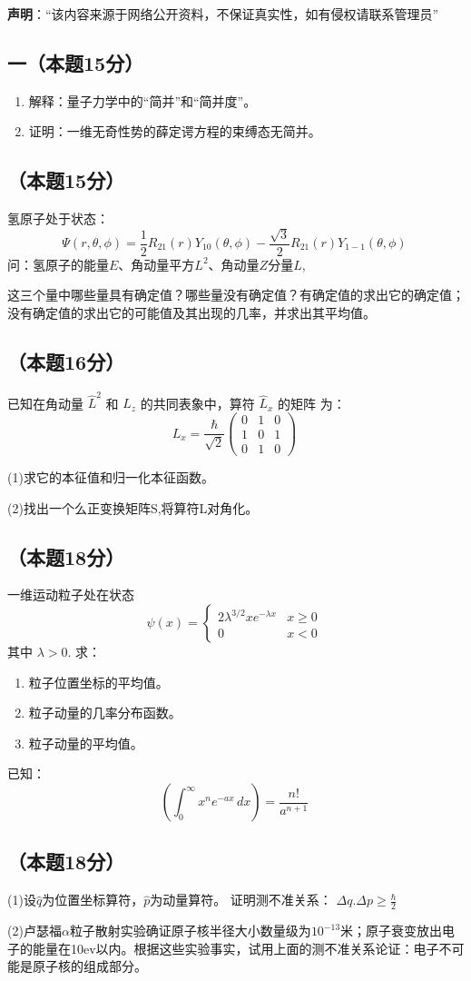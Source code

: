 
\textbf{声明}：“该内容来源于网络公开资料，不保证真实性，如有侵权请联系管理员”

\subsection{一（本题15分）}
\begin{enumerate}
\item 解释：量子力学中的“简并”和“简并度”。
\item 证明：一维无奇性势的薛定谔方程的束缚态无简并。
\end{enumerate}

\subsection{（本题15分）}
氢原子处于状态：
$$\Psi(r, \theta, \phi) = \frac{1}{2} R_{21}(r) Y_{10}(\theta, \phi) - \frac{\sqrt{3}}{2} R_{21}(r) Y_{1-1}(\theta, \phi)~$$
问：氢原子的能量$E$、角动量平方$L^2$、角动量$Z$分量$L$,

这三个量中哪些量具有确定值？哪些量没有确定值？有确定值的求出它的确定值；没有确定值的求出它的可能值及其出现的几率，并求出其平均值。

\subsection{（本题16分）}
已知在角动量 $\hat{L}^2$ 和 $\hat{L}_z$ 的共同表象中，算符 $\hat{L}_x$ 的矩阵
为：$$L_x = \frac{\hbar}{\sqrt{2}} \begin{pmatrix}
0 & 1 & 0 \\
1 & 0 & 1 \\
0 & 1 & 0
\end{pmatrix}~$$

(1)求它的本征值和归一化本征函数。

(2)找出一个么正变换矩阵S,将算符L对角化。

\subsection{（本题18分）}
一维运动粒子处在状态
$$\psi(x) = 
\begin{cases} 
2\lambda^{3/2} x e^{-\lambda x} &  x \geq 0 \\
0 &  x < 0
\end{cases}~$$
其中 $\lambda > 0$. 求：
\begin{enumerate}
    \item 粒子位置坐标的平均值。
    \item 粒子动量的几率分布函数。
    \item 粒子动量的平均值。
\end{enumerate}
已知：
$$\left( \int_{0}^{\infty} x^n e^{-ax} \, dx \right) = \frac{n!}{a^{n+1}}~$$

\subsection{（本题18分）}
(1)设$\hat q$为位置坐标算符，$\hat p$为动量算符。
证明测不准关系：
$\Delta q.\Delta p\ge \frac{\hbar}{2}$

(2)卢瑟福$\alpha$粒子散射实验确证原子核半径大小数量级为$10^{-13}$米；原子衰变放出电子的能量在10ev以内。根据这些实验事实，试用上面的测不准关系论证：电子不可能是原子核的组成部分。